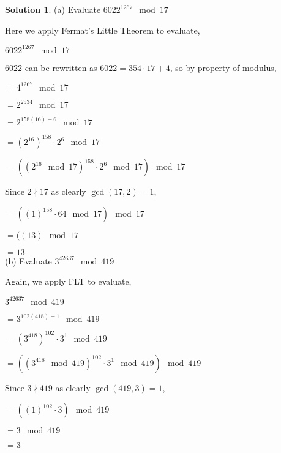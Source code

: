 \documentclass{article}
\theoremstyle{definition}
\newtheorem*{solution}{Solution}
\begin{document}
\begin{solution}

(a) Evaluate \(6022^{1267}\mod 17\)

Here we apply Fermat's Little Theorem to evaluate,

\(6022^{1267}\mod 17\)

\(6022\) can be rewritten as \(6022=354\cdot 17+4\), so by property of modulus,

\(=4^{1267}\mod 17\)

\(=2^{2534}\mod 17\)

\(=2^{158(16)+6}\mod 17\)

\(=(2^{16})^{158}\cdot 2^6\mod 17\)

\(=((2^{16}\mod 17)^{158}\cdot 2^6\mod 17)\mod 17\)

Since \(2\nmid 17\) as clearly \(\gcd (17,2)=1\),

\(=((1)^{158}\cdot 64\mod 17)\mod 17\)

\(=((13)\mod 17\)

\(=13\) \\

(b) Evaluate \(3^{42637}\mod 419\)

Again, we apply FLT to evaluate,

\(3^{42637}\mod 419\)

\(=3^{102(418)+1}\mod 419\)

\(=(3^{418})^{102}\cdot 3^1\mod 419\)

\(=((3^{418}\mod 419)^{102}\cdot 3^1\mod 419)\mod 419\)

Since \(3\nmid 419\) as clearly \(\gcd (419,3)=1\),

\(=((1)^{102}\cdot 3)\mod 419\)

\(=3\mod 419\)

\(=3\)

\end{solution}
\end{document}
